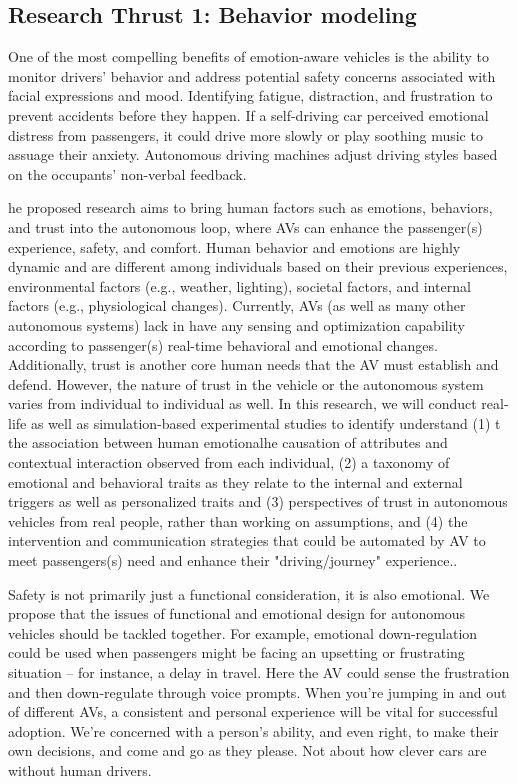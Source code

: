 \subsection{Research Thrust 1: Behavior modeling}
\label{sec:behaviour}

One of the most compelling benefits of emotion-aware vehicles is the ability to monitor drivers’ behavior and address potential safety concerns associated with facial expressions and mood.
Identifying fatigue, distraction, and frustration to prevent accidents before they happen.
If a self-driving car perceived emotional distress from passengers, it could drive more slowly or play soothing music to assuage their anxiety.
Autonomous driving machines adjust driving styles based on the occupants’ non-verbal feedback.

he proposed research aims to bring human factors such as emotions, behaviors, and trust into the autonomous loop, where AVs can enhance the passenger(s) experience, safety, and comfort. Human behavior and emotions are highly dynamic and are different among individuals based on their previous experiences, environmental factors (e.g., weather, lighting), societal factors, and internal factors (e.g., physiological changes). Currently, AVs (as well as many other autonomous systems) lack in have any sensing and optimization capability according to passenger(s) real-time behavioral and emotional changes. Additionally, trust is another core human needs that the AV must establish and defend. However, the nature of trust in the vehicle or the autonomous system varies from individual to individual as well. In this research, we will conduct real-life as well as simulation-based experimental studies to identify understand (1) t the association between human emotionalhe causation of attributes and contextual interaction observed from each individual, (2) a taxonomy of emotional and behavioral traits as they relate to the internal and external triggers as well as personalized traits and (3) perspectives of trust in autonomous vehicles from real people, rather than working on assumptions, and (4) the intervention and communication strategies that could be automated by AV to meet passengers(s) need and enhance their "driving/journey" experience.. 



Safety is not primarily just a functional consideration, it is also emotional. We propose that the issues of functional and emotional design for autonomous vehicles should be tackled together.
For example, emotional down-regulation could be used when passengers might be facing an upsetting or frustrating situation – for instance, a delay in travel. Here the AV could sense the frustration and then down-regulate through voice prompts. When you’re jumping in and out of different AVs, a consistent and personal experience will be vital for successful adoption.
 We’re concerned with a person’s ability, and even right, to make their own decisions, and come and go as they please. Not about how clever cars are without human drivers. 




